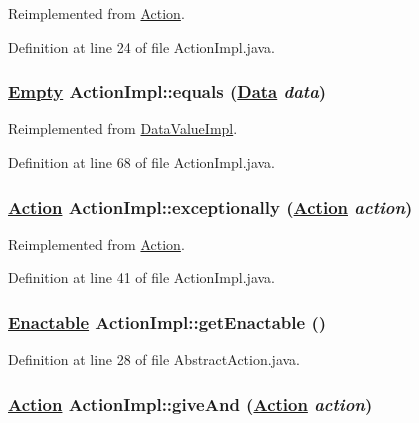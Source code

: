Reimplemented from \hyperlink{interfaceAction_a0}{Action}.

Definition at line 24 of file Action\-Impl.java.\hypertarget{classActionImpl_a21}{
\subsubsection[equals]{\setlength{\rightskip}{0pt plus 5cm}\hyperlink{interfaceEmpty}{Empty} Action\-Impl::equals (\hyperlink{interfaceData}{Data} {\em data})}}
\label{classActionImpl_a21}




Reimplemented from \hyperlink{classDataValueImpl_a5}{Data\-Value\-Impl}.

Definition at line 68 of file Action\-Impl.java.\hypertarget{classActionImpl_a15}{
\subsubsection[exceptionally]{\setlength{\rightskip}{0pt plus 5cm}\hyperlink{interfaceAction}{Action} Action\-Impl::exceptionally (\hyperlink{interfaceAction}{Action} {\em action})}}
\label{classActionImpl_a15}




Reimplemented from \hyperlink{interfaceAction_a5}{Action}.

Definition at line 41 of file Action\-Impl.java.\hypertarget{classActionImpl_a0}{
\subsubsection[getEnactable]{\setlength{\rightskip}{0pt plus 5cm}\hyperlink{interfaceEnactable}{Enactable} Action\-Impl::get\-Enactable ()}}
\label{classActionImpl_a0}




Definition at line 28 of file Abstract\-Action.java.\hypertarget{classActionImpl_a4}{
\subsubsection[giveAnd]{\setlength{\rightskip}{0pt plus 5cm}\hyperlink{interfaceAction}{Action} Action\-Impl::give\-And (\hyperlink{interfaceAction}{Action} {\em action})}}
\label{classActionImpl_a4}




